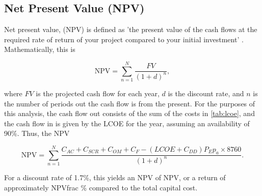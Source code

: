 \subsection{Net Present Value (NPV)}

Net present value, (NPV) is defined as 'the present value of the cash flows at the required rate of return of your project compared to your initial investment' \cite{gallo2014refresher}. Mathematically, this is

\begin{equation}
    \mbox{NPV} = \sum_{n=1}^N \frac{FV}{(1+d)^n},
\end{equation}

 where $FV$ is the projected cash flow for each year, $d$ is the discount rate, and $n$ is the number of periods out the cash flow is from the present. For the purposes of this analysis, the cash flow out consists of the sum of the costs in \ref{tab:lcoe}, and the cash flow in is given by the LCOE for the year, assuming an availability of 90\%. Thus, the NPV

 \begin{equation}
     \mbox{NPV} = \sum_{n=1}^N \frac{C_{AC}+ C_{SCR}+ C_{OM} +C_F - (LCOE + C_{DD})P_Ep_a \times 8760 }{(1+d)^n}.
 \end{equation}

For a discount rate of 1.7\%, this yields an NPV of NPV, or a return of approximately NPVfrac \% compared to the total capital cost.